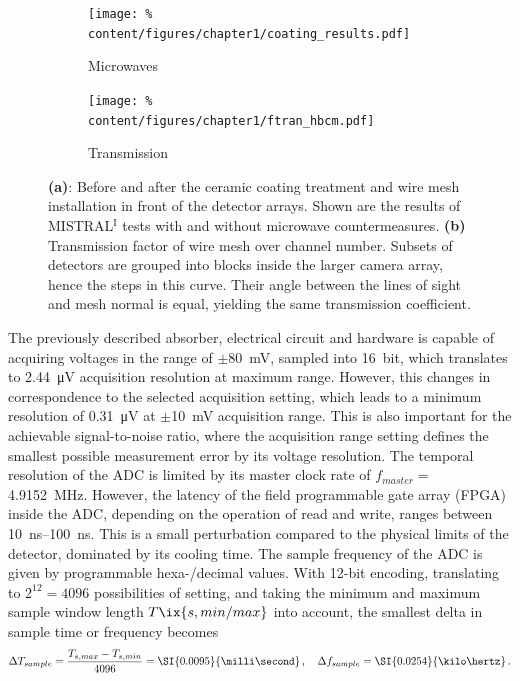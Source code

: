             \begin{figure}[t]%
                \centering%
                \begin{subfigure}{0.46\textwidth}%
                    \texttt{[image: \%
                        content/figures/chapter1/coating\_results.pdf]}%
                    \caption{Microwaves}\label{fig:coating}
                \end{subfigure}%
                \hfill%
                \begin{subfigure}{0.48\textwidth}%
                    \texttt{[image: \%
                        content/figures/chapter1/ftran\_hbcm.pdf]}%
                    \caption{Transmission}\label{fig:ftran}
                \end{subfigure}%
                \caption{\textbf{(a)}: Before and after the ceramic coating treatment and wire mesh installation in front of the detector arrays. Shown are the results of MISTRAL$^{\text{I}}$ tests with and without microwave countermeasures. \textbf{(b)} Transmission factor of wire mesh over channel number. Subsets of detectors are grouped into blocks inside the larger camera array, hence the steps in this curve. Their angle between the lines of sight and mesh normal is equal, yielding the same transmission coefficient.}\label{fig:coating_ftran}%
            \end{figure}%
%
            The previously described absorber, electrical circuit and hardware is capable of acquiring voltages in the range of $\pm$\SI{80}{\milli\volt}, sampled into \SI{16}{bit}, which translates to \SI{2.44}{\micro\volt} acquisition resolution at maximum range. However, this changes in correspondence to the selected acquisition setting, which leads to a minimum resolution of \SI{0.31}{\micro\volt} at $\pm$\SI{10}{\milli\volt} acquisition range. This is also important for the achievable signal-to-noise ratio, where the acquisition range setting defines the smallest possible measurement error by its voltage resolution. The temporal resolution of the ADC is limited by its master clock rate of $f_{master}=\,$\SI{4.9152}{\mega\hertz}. However, the latency of the field programmable gate array (FPGA) inside the ADC, depending on the operation of read and write, ranges between \SIrange{10}{100}{\nano\second}. This is a small perturbation compared to the physical limits of the detector, dominated by its cooling time. The sample frequency of the ADC is given by programmable hexa-/decimal values. With 12-bit encoding, translating to $2^{12}=4096$ possibilities of setting, and taking the minimum and maximum sample window length $T\ix{s, min/max}$ into account, the smallest delta in sample time or frequency becomes%
%
            \begin{align}%
                \Delta T_{sample}=\frac{T_{s, max}-T_{s, min}}{4096}=\text{\SI{0.0095}{\milli\second}}\,,\quad\Delta f_{sample}=\text{\SI{0.0254}{\kilo\hertz}}\,.\nonumber%
            \end{align}%
%
            
